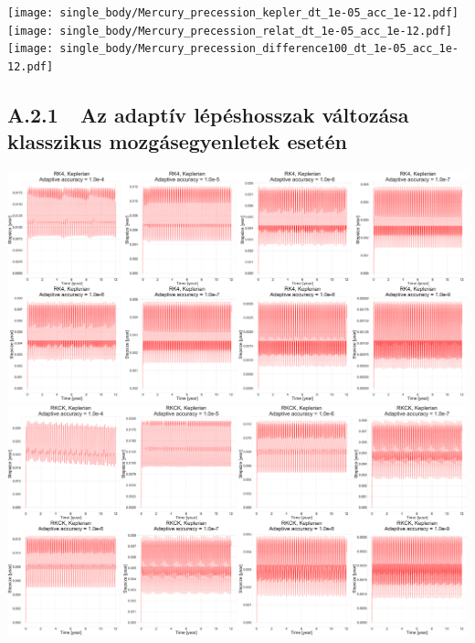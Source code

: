 {\centering\texttt{[image: single\_body/Mercury\_precession\_kepler\_dt\_1e-05\_acc\_1e-12.pdf]}}
\label{fig:7}
\hfill \break \break
{\centering\texttt{[image: single\_body/Mercury\_precession\_relat\_dt\_1e-05\_acc\_1e-12.pdf]}}
\label{fig:8}
\hfill \break \break
{\centering\texttt{[image: single\_body/Mercury\_precession\_difference100\_dt\_1e-05\_acc\_1e-12.pdf]}}
\label{fig:9}

\newpage

\subsection*{A.2.1\ \ Az adaptív lépéshosszak változása klasszikus mozgásegyenletek esetén}

{\centering\includegraphics[width=\textwidth]{images/single_body/Mercury_adaptive_accuracy_kepler_runge.pdf}}
\label{fig:10}
\hfill \break \break
{\centering\includegraphics[width=\textwidth]{images/single_body/Mercury_adaptive_accuracy_kepler_rkck.pdf}}
\label{fig:11}

